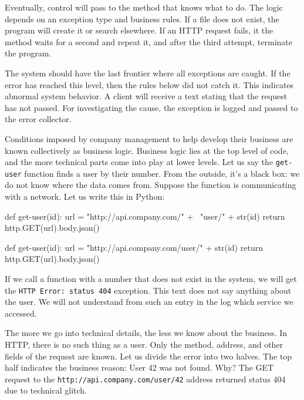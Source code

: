 Eventually, control will pass to the method that knows what to do.
The logic depends on an exception type and business rules. If a file does not exist, the program will create it or search elsewhere. If an HTTP request fails, it the method waits for a second and repeat it, and after the third attempt, terminate the program.

The system should have the last frontier where all exceptions are caught. If the error has reached this level, then the rules below did not catch it. This indicates abnormal system behavior. A client will receive a text stating that the request has not passed. For investigating the cause, the exception is logged and passed to the error collector.

Conditions imposed by company management to help develop their business are known collectively as business logic. Business logic lies at the top level of code, and the more technical parts come into play at lower levels. Let us say the \verb|get-user| function finds a user by their number. From the outside, it's a black box: we do not know where the data comes from. Suppose the function is communicating with a network. Let us write this in Python:

\ifx\DEVICETYPE\MOBILE

\begin{english}
  \begin{python}
def get-user(id):
  url = "http://api.company.com/" + \
        "user/" + str(id)
  return http.GET(url).body.json()
  \end{python}
\end{english}

\else

\begin{english}
  \begin{python}
def get-user(id):
  url = "http://api.company.com/user/" + str(id)
  return http.GET(url).body.json()
  \end{python}
\end{english}

\fi

If we call a function with a number that does not exist in the system, we will get the \verb|HTTP Error: status 404| exception. This text does not say anything about the user. We will not understand from such an entry in the log which service we accessed.

The more we go into technical details, the less we know about the business. In HTTP, there is no such thing as a user. Only the method, address, and other fields of the request are known. Let us divide the error into two halves.
The top half indicates the business reason: User 42 was not found. Why? The GET request to the \verb|http://api.company.com/user/42| address returned status 404 due to technical glitch.

